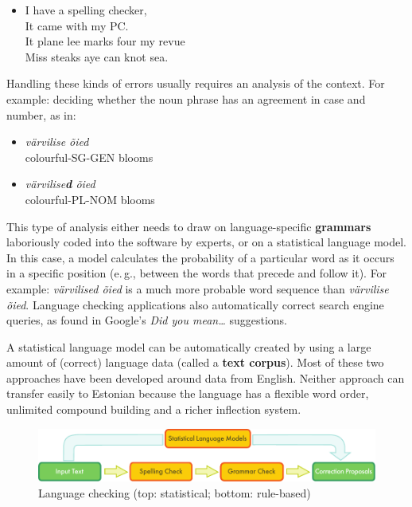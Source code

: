 \begin{multicols}{2}
\begin{itemize}
\item[]  I have a spelling checker,\\
  It came with my PC.\\
  It plane lee marks four my revue\\
  Miss steaks aye can knot sea.
\end{itemize}

Handling these kinds of errors usually requires an analysis of the context. For example: deciding whether the noun phrase has an agreement in case and number, as in:

\begin{itemize}
\item \textit {värvilise õied}\\ 
 colourful-SG-GEN blooms
\item \textit {värvilise\textbf{d} õied}\\
 colourful-PL-NOM blooms
\end{itemize}

This type of analysis either needs to draw on language-specific \textbf{grammars} laboriously coded into the software by experts, or on a statistical language model.  In this case, a model calculates the probability of a particular word as it occurs in a specific position (e.\,g., between the words that precede and follow it).  For example: \textit{värvilised õied} is a much more probable word sequence than \textit{värvilise õied}.  Language checking applications also automatically correct search engine queries, as found in Google's \textit{Did you mean…} suggestions.

A statistical language model can be automatically created by using a large amount of (correct) language data (called a \textbf{text corpus}). 
Most of these two approaches have been developed around data from English. 
Neither approach can transfer easily to Estonian because the language has a flexible word order, unlimited compound building and a richer inflection system. 

\begin{figure}[htb]
  \center
  \includegraphics[width=\textwidth]{../_media/english/language_checking}
  \caption{Language checking (top: statistical; bottom: rule-based)}
  \label{fig:langcheckingaarch_en}
\end{figure}


\end{multicols}
